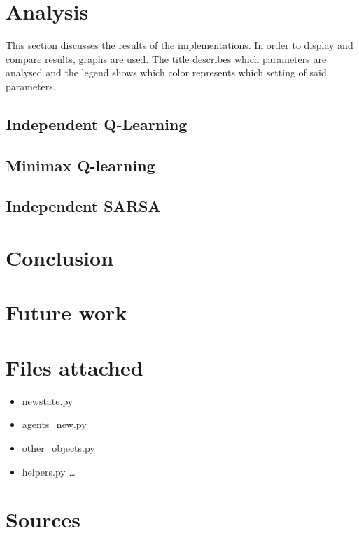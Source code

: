 \documentclass{article}
\begin{document}
\pagebreak


\section{Analysis}
This section discusses the results of the implementations. In order to display and compare results, graphs are used. The title describes which parameters are analysed and the legend shows which color represents which setting of said parameters.

\subsection{Independent Q-Learning}

\subsection{Minimax Q-learning}

\subsection{Independent SARSA}

\pagebreak


\section{Conclusion}

\pagebreak


\section{Future work}

\pagebreak


\section{Files attached}

\begin{itemize}
\item newstate.py
\item agents\_new.py
\item other\_objects.py
\item helpers.py \ldots
\end{itemize}


\section{Sources}

\nocite{*}
\printbibliography


\begin{comment}


\begin{itemize}
	\item [1] Barto and Sutton (http://webdocs.cs.ualberta.ca/~sutton/book/the-book.html) \ldots
\end{itemize}
\end{comment}
\end{document}
